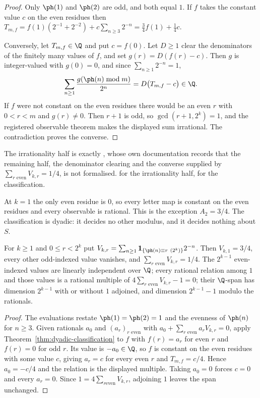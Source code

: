 \begin{proof}
Only $\ph(1)$ and $\ph(2)$ are odd, and both equal $1$. If $f$ takes the
constant value $c$ on the even residues then
$T_{m,f}=f(1)(2^{-1}+2^{-2})+c\sum_{n\ge3}2^{-n}=\frac34f(1)+\frac14c$.

Conversely, let $T_{m,f}\in\Q$ and put $c=f(0)$. Let $D\ge1$ clear the
denominators of the finitely many values of $f$, and set $g(r)=D(f(r)-c)$.
Then $g$ is integer-valued with $g(0)=0$, and since $\sum_{n\ge1}2^{-n}=1$,
\[
  \sum_{n\ge1}\frac{g(\ph(n)\bmod m)}{2^n}=D\bigl(T_{m,f}-c\bigr)\in\Q .
\]
If $f$ were not constant on the even residues there would be an even $r$ with
$0<r<m$ and $g(r)\ne0$. Then $r+1$ is odd, so $\gcd(r+1,2^k)=1$, and the
registered observable theorem makes the displayed sum irrational. The
contradiction proves the converse.
\end{proof}

The irrationality half is exactly
,
whose own documentation records that the remaining half, the denominator
clearing and the converse supplied by $\sum_{r\text{ even}}V_{k,r}=1/4$, is
not formalised.  for the irrationality half,  for the
classification.

At $k=1$ the only even residue is $0$, so every letter map is constant on the
even residues and every observable is rational. This is the exception
$A_2=3/4$. The classification is dyadic: it decides no other modulus, and it
decides nothing about $S$.

\begin{cor}
\label{cor:dyadic-relations}
For $k\ge1$ and $0\le r<2^k$ put
$V_{k,r}=\sum_{n\ge1}\mathbf1_{\{\ph(n)\equiv r\ (2^k)\}}2^{-n}$.
Then $V_{k,1}=3/4$, every other odd-indexed value vanishes, and
$\sum_{r\text{ even}}V_{k,r}=1/4$. The $2^{k-1}$ even-indexed values are
linearly independent over $\Q$; every rational relation among $1$ and those
values is a rational multiple of $4\sum_{r\text{ even}}V_{k,r}-1=0$; their
$\Q$-span has dimension $2^{k-1}$ with or without $1$ adjoined, and dimension
$2^{k-1}-1$ modulo the rationals. 
\end{cor}

\begin{proof}
The evaluations restate $\ph(1)=\ph(2)=1$ and the evenness of $\ph(n)$ for
$n\ge3$. Given rationals $a_0$ and $(a_r)_{r\text{ even}}$ with
$a_0+\sum_{r\text{ even}}a_rV_{k,r}=0$, apply
Theorem~\ref{thm:dyadic-classification} to $f$ with $f(r)=a_r$ for even $r$
and $f(r)=0$ for odd $r$. Its value is $-a_0\in\Q$, so $f$ is constant on the
even residues with some value $c$, giving $a_r=c$ for every even $r$ and
$T_{m,f}=c/4$. Hence $a_0=-c/4$ and the relation is the displayed multiple.
Taking $a_0=0$ forces $c=0$ and every $a_r=0$. Since $1=4\sum_{r\text{
even}}V_{k,r}$, adjoining $1$ leaves the span unchanged.
\end{proof}

